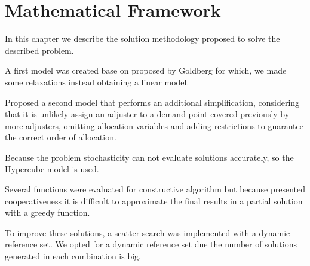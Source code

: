 \section{Mathematical Framework}
In this chapter
we describe the solution methodology proposed
to solve the described problem.

A first model was created
base on proposed by Goldberg \cite{goldberg1990validating}
for which,
we made some relaxations
instead obtaining a linear model.

Proposed a second model
that performs an additional simplification,
considering that
it is unlikely
assign an adjuster
to a demand point
covered previously
by more adjusters,
omitting allocation variables
and adding restrictions
to guarantee
the correct order of allocation.

Because the problem stochasticity
can not evaluate solutions accurately,
so the Hypercube model is used.

Several functions were evaluated
for constructive algorithm
but because presented cooperativeness
it is difficult
to approximate the final results
in a partial solution
with a greedy function.

To improve these solutions,
a scatter-search was implemented
with a dynamic reference set.
We opted for a dynamic reference set
due the number of solutions generated
in each combination is big.
